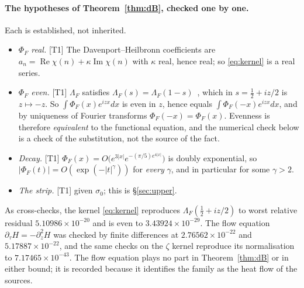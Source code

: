 \documentclass[11pt,a4paper]{article}
\theoremstyle{remark}
\newcommand{\tier}[1]{{\small\textsf{[#1]}}}
\newcommand{\PhiF}{\Phi_F}
\begin{document}
\paragraph{The hypotheses of Theorem~\ref{thm:dB}, checked one by one.}
Each is established, not inherited.
\begin{itemize}\itemsep2pt
\item \emph{$\PhiF$ real.} \tier{T1} The Davenport--Heilbronn coefficients are
$a_n=\operatorname{Re}\chi(n)+\kappa\operatorname{Im}\chi(n)$ with $\kappa$ real, hence real;
so \eqref{eq:kernel} is a real series.
\item \emph{$\PhiF$ even.} \tier{T1} $\Lambda_F$ satisfies
$\Lambda_F(s)=\Lambda_F(1-s)$~\cite[\S1]{dhrep}, which in $s=\tfrac12+iz/2$ is $z\mapsto-z$.
So $\int\PhiF(x)e^{izx}dx$ is even in $z$, hence equals $\int\PhiF(-x)e^{izx}dx$, and by
uniqueness of Fourier transforms $\PhiF(-x)=\PhiF(x)$. Evenness is therefore
\emph{equivalent} to the functional equation, and the numerical check below is a check of
the substitution, not the source of the fact.
\item \emph{Decay.} \tier{T1} $\PhiF(x)=O\bigl(e^{3|x|}e^{-(\pi/5)e^{4|x|}}\bigr)$ is doubly
exponential, so $|\PhiF(t)|=O(\exp(-|t|^{\gamma}))$ for \emph{every} $\gamma$, and in
particular for some $\gamma>2$.
\item \emph{The strip.} \tier{T1} given $\sigma_0$; this is \S\ref{sec:upper}.
\end{itemize}

\noindent \tier{T2-N} As cross-checks, the kernel \eqref{eq:kernel} reproduces
$\Lambda_F(\tfrac12+iz/2)$ to worst relative residual $5.10986\times10^{-20}$ and is even to
$3.43924\times10^{-29}$. The flow equation
$\partial_\tau H=-\partial_z^2H$ was checked by finite differences at
$2.76562\times10^{-22}$ and $5.17887\times10^{-22}$, and the same checks on the $\zeta$
kernel reproduce its normalisation to $7.17465\times10^{-43}$. The flow equation plays no
part in Theorem~\ref{thm:dB} or in either bound; it is recorded because it identifies the
family as the heat flow of the sources.
\end{document}
